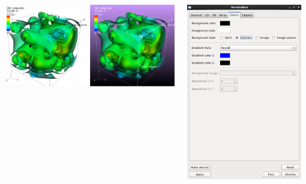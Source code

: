\begin{frame}
\begin{columns}
\begin{column}{6cm}
	\includegraphics[width=\columnwidth]{figs/visit-pract/VisIt_backgrounds}
\end{column}
\begin{column}{4.75cm}
        \includegraphics[width=\columnwidth]{figs/visit-guis/visit_annot-colors}
\end{column}
\end{columns}
\end{frame}


